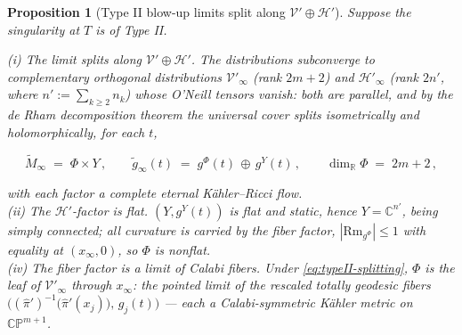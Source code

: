 \documentclass[11pt]{amsart}
\theoremstyle{plain}
\numberwithin{equation}{section}
\newtheorem{proposition}[theorem]{Proposition}
\theoremstyle{definition}
\theoremstyle{remark}
\begin{document}
\begin{proposition}[Type II blow-up limits split along $\mathcal{V}' \oplus \mathcal{H}'$]\label{prop:typeII-splitting}
	Suppose the singularity at $T$ is of Type II. 
	
	{(i) The limit splits along} $\mathcal{V}' \oplus \mathcal{H}'$\emph{.} The distributions subconverge to complementary orthogonal distributions $\mathcal{V}'_\infty$ (rank $2 m + 2$) and $\mathcal{H}'_\infty$ (rank $2 n'$, where $n' := \sum_{k \geq 2} n_k$) whose O'Neill tensors vanish: both are parallel, and by the de Rham decomposition theorem the universal cover splits isometrically and holomorphically, for each $t$,
	
	\begin{equation}\label{eq:typeII-splitting}
		\widetilde{M}_\infty \;=\; \Phi \times Y \,, \qquad \widetilde{g}_\infty (t) \;=\; g^\Phi (t) \,\oplus\, g^Y (t) \,, \qquad \dim_{\mathbb{R}} \Phi \;=\; 2 m + 2 \,,
	\end{equation}
	
	with each factor a complete eternal Kähler--Ricci flow.\\
	
	{(ii) The} $\mathcal{H}'$\emph{-factor is flat.} $( Y, g^Y (t) )$ is flat and static, hence $Y = \mathbb{C}^{n'}$, being simply connected; all curvature is carried by the fiber factor, $| \mathrm{Rm}_{g^\Phi} | \leq 1$ with equality at $( x_\infty, 0 )$, so $\Phi$ is nonflat.\\
	
	{(iv) The fiber factor is a limit of Calabi fibers.} Under \eqref{eq:typeII-splitting}, $\Phi$ is the leaf of $\mathcal{V}'_\infty$ through $x_\infty$: the pointed limit of the rescaled totally geodesic fibers $\big( ( \widehat{\pi}' )^{-1} \big( \widehat{\pi}' ( x_j ) \big), \, g_j (t) \big)$ --- each a Calabi-symmetric Kähler metric on $\mathbb{CP}^{m+1}$.
	
\end{proposition}
\end{document}

